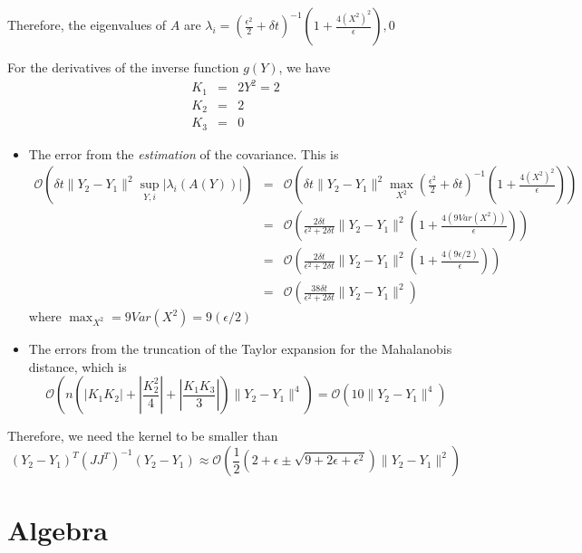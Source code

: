 \documentclass[12pt]{article}
\begin{document}
Therefore, the eigenvalues of $A$ are $\lambda_i = \left( \frac{\epsilon^2}{2} +  \delta t \right)^{-1} \left( 1 + \frac{4\left(X^2 \right)^2}{\epsilon} \right), 0$

For the derivatives of the inverse function $g(Y)$, we have
\begin{eqnarray}
K_1 &=& 2 Y^2 = 2 \\
K_2 &=& 2 \\
K_3 &=& 0
\end{eqnarray}

\begin{itemize}
\item The error from the {\em estimation} of the covariance.
%
This is
\begin{eqnarray}
\mathcal{O} \left( \delta t \| Y_2 - Y_1 \|^2 \sup_{Y, i} |\lambda_i(A(Y))| \right) 
&=& \mathcal{O} \left( \delta t \| Y_2 - Y_1 \| ^2 \max_{X^2} \left( \frac{\epsilon^2}{2} +  \delta t \right)^{-1} \left( 1 + \frac{4\left(X^2 \right)^2}{\epsilon} \right) \right)  \\
&=& \mathcal{O} \left( \frac{2 \delta t}{\epsilon^2 + 2 \delta t} \| Y_2 - Y_1 \| ^2 \left( 1 + \frac{4 \left( 9 Var(X^2) \right)}{\epsilon} \right) \right) \\
&=& \mathcal{O} \left( \frac{2 \delta t}{\epsilon ^2 + 2 \delta t} \| Y_2 - Y_1 \| ^2 \left( 1 + \frac{4 \left( 9 \epsilon /2 \right)}{\epsilon} \right) \right) \\
&=& \mathcal{O} \left( \frac{38 \delta t}{\epsilon ^2 + 2 \delta t} \| Y_2 - Y_1 \| ^2 \right)
\end{eqnarray}
where $\max_{X^2}  = 9 Var(X^2) = 9 (\epsilon/2)$


\item The errors from the truncation of the Taylor expansion for the Mahalanobis distance, which is 
$$\mathcal{O} \left(  n \left( \left| K_1 K_2 \right| + \left| \frac{ K_2^2}{4} \right|  + \left| \frac{K_1 K_3}{3} \right|  \right) \| Y_2 - Y_1 \| ^4  \right)
= \mathcal{O} \left( 10 \| Y_2 - Y_1 \| ^4  \right) $$
\end{itemize}

Therefore, we need the kernel to be smaller than 
\begin{equation}
(Y_2 - Y_1)^T (JJ^T)^{-1} (Y_2 - Y_1) 
\approx \mathcal{O} \left(  \frac{1}{2} \left( 2 + \epsilon \pm \sqrt{ 9 + 2 \epsilon + \epsilon^2}\right) \|Y_2 - Y_1 \|^2\right) 
\end{equation}

\appendix

\section{Algebra}
\end{document}

